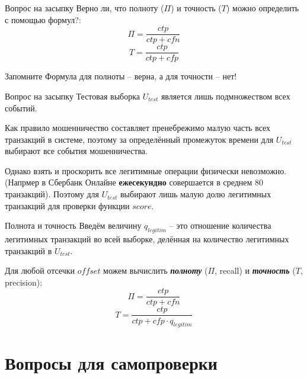\documentclass{beamer}
\newcommand{\termdef}[1]{\textbf{\textit{#1}}}
\newcommand{\auditorium}[1]{\color{red}{\textbf{#1}}}
\begin{document}
	\begin{frame}{Вопрос на засыпку}
	Верно ли, что полноту ($\Pi$) и точность ($T$) можно определить с помощью формул?:
	\begin{equation*}
	\Pi = \frac{ctp}{ctp + cfn}
	\end{equation*}
	\begin{equation*}
	T = \frac{ctp}{ctp + cfp}
	\end{equation*}
	 \begin{block}{Запомните}
		Формула для полноты -- верна, а для точности -- нет!
	\end{block}
	\auditorium{Почему?}
	\end{frame}

	\begin{frame}{Вопрос на засыпку}
	Тестовая выборка $U_{test}$ является лишь подмножеством всех событий. 
	
	Как правило мошенничество составляет пренебрежимо малую часть всех транзакций в системе,
	поэтому за определённый промежуток времени для $U_{test}$ выбирают все события мошенничества.
	
	Однако взять и проскорить все легитимные операции физически невозможно.
	(Напрмер в Сбербанк Онлайне \textbf{ежесекундно} совершается в среднем 80 транзакций).
	Поэтому для $U_{test}$ выбирают лишь малую долю легитимных транзакций для проверки функции
	$score$.
	\end{frame}

	\begin{frame}{Полнота и точность}
	Введём величину $q_{legitim}$ -- это отношение количества легитимных транзакций во всей выборке, 
	делённая на количество легитимных транзакций в  $U_{test}$.
	
	Для любой отсечки $offset$ можем вычислить \termdef{полноту} ($\Pi$, recall) и \termdef{точность} ($T$, precision):
		\begin{equation}\label{eq:recall_by_counts}
		\Pi = \frac{ctp}{ctp + cfn}
		\end{equation}
		\begin{equation}\label{eq:presicionl_by_counts}
		T = \frac{ctp}{ctp + cfp \cdot q_{legitim}}
		\end{equation}
	\end{frame}

   \section{Вопросы для самопроверки}
\end{document}
